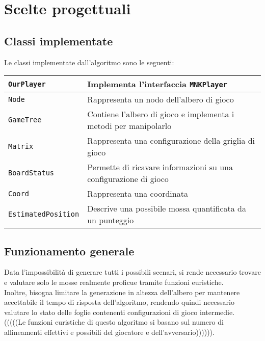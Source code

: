 \documentclass[11pt]{article}
\begin{document}
\section*{Scelte progettuali}
\subsection*{Classi implementate}
Le classi implementate dall'algoritmo sono le seguenti:
\begin{table}[H]	%
\centering			%
\def\arraystretch{1.5}
\begin{tabular}{|l|p{3in}|}	%
\hline	%
\texttt{OurPlayer} & Implementa l'interfaccia \texttt{MNKPlayer} \\ \hline
\texttt{Node} & Rappresenta un nodo dell'albero di gioco \\ \hline
\texttt{GameTree} & Contiene l'albero di gioco e implementa i metodi per manipolarlo \\ \hline
\texttt{Matrix} & Rappresenta una configurazione della griglia di gioco \\ \hline
\texttt{BoardStatus} & Permette di ricavare informazioni su una configurazione di gioco \\ \hline
\texttt{Coord} & Rappresenta una coordinata \\ \hline
\texttt{EstimatedPosition} & Descrive una possibile mossa quantificata da un punteggio \\ \hline
\end{tabular}
\end{table}

\subsection*{Funzionamento generale}
Data l'impossibilità di generare tutti i possibili scenari, si rende necessario trovare e valutare solo le mosse realmente proficue tramite funzioni euristiche.\\
Inoltre, bisogna limitare la generazione in altezza dell'albero per mantenere accettabile il tempo di risposta dell'algoritmo, rendendo quindi necessario valutare lo stato delle foglie contenenti configurazioni di gioco intermedie.\\
(((((Le funzioni euristiche di questo algoritmo si basano sul numero di allineamenti effettivi e possibili del giocatore e dell'avversario)))))).
\end{document}
